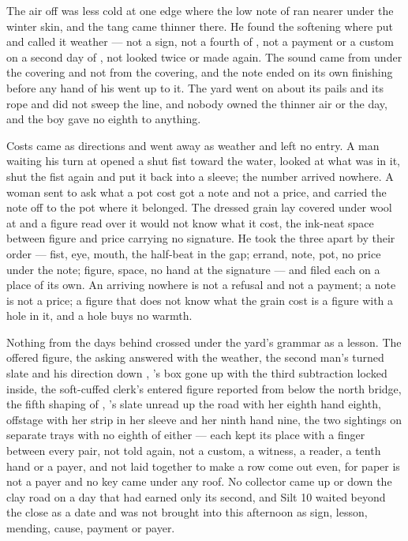 The air off  was less cold at one edge where the low note of  ran nearer under the winter skin, and the tang came thinner there. He found the softening where put and called it weather --- not a sign, not a fourth of , not a payment or a custom on a second day of , not looked twice or made again. The sound came from under the covering and not from the covering, and the note ended on its own finishing before any hand of his went up to it. The yard went on about its pails and its rope and did not sweep the line, and nobody owned the thinner air or the day, and the boy gave no eighth to anything.

\scenebreak

Costs came as directions and went away as weather and left no entry. A man waiting his turn at  opened a shut fist toward the water, looked at what was in it, shut the fist again and put it back into a sleeve; the number arrived nowhere. A woman sent to ask what a pot cost got a note and not a price, and carried the note off to the pot where it belonged. The dressed grain lay covered under wool at  and a figure read over it would not know what it cost, the ink-neat space between figure and price carrying no signature. He took the three apart by their order --- fist, eye, mouth, the half-beat in the gap; errand, note, pot, no price under the note; figure, space, no hand at the signature --- and filed each on a place of its own. An arriving nowhere is not a refusal and not a payment; a note is not a price; a figure that does not know what the grain cost is a figure with a hole in it, and a hole buys no warmth.

Nothing from the days behind crossed under the yard's grammar as a lesson. The offered figure, the asking answered with the weather, the second man's turned slate and his direction down , 's box gone up  with the third subtraction locked inside, the soft-cuffed clerk's entered figure reported from  below the north bridge, the fifth shaping of , 's slate unread up the road with her eighth hand eighth,  offstage with her strip in her sleeve and her ninth hand nine, the two sightings on separate trays with no eighth of either --- each kept its place with a finger between every pair, not told again, not a custom, a witness, a reader, a tenth hand or a payer, and not laid together to make a row come out even, for paper is not a payer and no key came under any roof. No collector came up or down the clay road on a day that had earned only its second, and Silt 10 waited beyond the close as a date and was not brought into this afternoon as sign, lesson, mending, cause, payment or payer.

